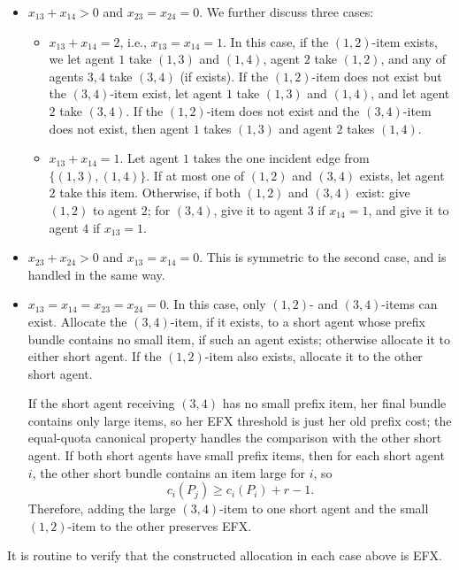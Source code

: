 \documentclass{article}
\theoremstyle{definition}
\begin{document}
\begin{itemize}
    If $(1,2)$ does not exist and $(3,4)$ exists, the item $(3,4)$ is allocated by this rule: if $x_{13}=x_{14}=x_{23}=x_{24}=1$, item $(3,4)$ is allocated to any of agents $3$ and $4$; otherwise, item $(3,4)$ is given to any agent $i\in\{1,2\}$ with $x_{i3}+x_{i4}\leq1$.
    \item $x_{13}+x_{14}>0$ and $x_{23}=x_{24}=0$. We further discuss three cases:
    \begin{itemize}
        \item $x_{13}+x_{14}=2$, i.e., $x_{13}=x_{14}=1$. In this case, if the $(1,2)$-item exists, we let agent $1$ take $(1,3)$ and $(1,4)$, agent $2$ take $(1,2)$, and any of agents $3,4$ take $(3,4)$ (if exists). If the $(1,2)$-item does not exist but the $(3,4)$-item exist, let agent $1$ take $(1,3)$ and $(1,4)$, and let agent $2$ take $(3,4)$. If the $(1,2)$-item does not exist and the $(3,4)$-item does not exist, then agent $1$ takes $(1,3)$ and agent $2$ takes $(1,4)$.
        \item $x_{13}+x_{14}=1$. Let agent $1$ takes the one incident edge from $\{(1,3),(1,4)\}$. If at most one of $(1,2)$ and $(3,4)$ exists, let agent $2$ take this item. Otherwise, if both $(1,2)$ and $(3,4)$ exist: give $(1,2)$ to agent $2$; for $(3,4)$, give it to agent $3$ if $x_{14}=1$, and give it to agent $4$ if $x_{13}=1$.
    \end{itemize}
    \item $x_{23}+x_{24}>0$ and $x_{13}=x_{14}=0$. This is symmetric to the second case, and is handled in the same way.
    \item $x_{13}=x_{14}=x_{23}=x_{24}=0$. In this case, only \((1,2)\)- and \((3,4)\)-items can exist. Allocate the \((3,4)\)-item, if it exists, to a short agent whose prefix bundle contains no small item, if such an agent exists; otherwise allocate it to either short agent.  If the \((1,2)\)-item also exists, allocate it to the other short agent.

    If the short agent receiving $(3,4)$ has no small prefix item, her final bundle contains only large items, so her EFX threshold is just her old prefix cost; the equal-quota canonical property handles the comparison with the other short agent. If both short agents have small prefix items, then for each short agent $i$, the other short bundle contains an item large for $i$, so
$$c_i(P_j)\geq c_i(P_i)+r-1.$$
Therefore, adding the large $(3,4)$-item to one short agent and the small $(1,2)$-item to the other preserves EFX.
\end{itemize}
It is routine to verify that the constructed allocation in each case above is EFX.
\end{document}
